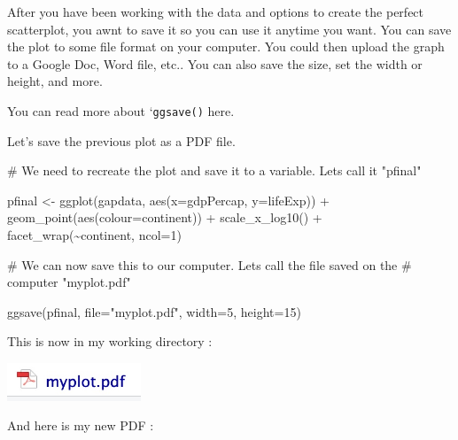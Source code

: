 \documentclass[
  letterpaper,
  DIV=11,
  numbers=noendperiod]{scrreprt}
\newenvironment{Shaded}{\begin{snugshade}}{\end{snugshade}}
\newcommand{\AttributeTok}[1]{\textcolor[rgb]{0.40,0.45,0.13}{#1}}
\newcommand{\CommentTok}[1]{\textcolor[rgb]{0.37,0.37,0.37}{#1}}
\newcommand{\DecValTok}[1]{\textcolor[rgb]{0.68,0.00,0.00}{#1}}
\newcommand{\FunctionTok}[1]{\textcolor[rgb]{0.28,0.35,0.67}{#1}}
\newcommand{\NormalTok}[1]{\textcolor[rgb]{0.00,0.23,0.31}{#1}}
\newcommand{\OtherTok}[1]{\textcolor[rgb]{0.00,0.23,0.31}{#1}}
\newcommand{\SpecialCharTok}[1]{\textcolor[rgb]{0.37,0.37,0.37}{#1}}
\newcommand{\StringTok}[1]{\textcolor[rgb]{0.13,0.47,0.30}{#1}}
\begin{document}
After you have been working with the data and options to create the
perfect scatterplot, you awnt to save it so you can use it anytime you
want. You can save the plot to some file format on your computer. You
could then upload the graph to a Google Doc, Word file, etc.. You can
also save the size, set the width or height, and more.

You can read more about `\texttt{ggsave()} here.

Let's save the previous plot as a PDF file.

\begin{Shaded}
\begin{Highlighting}[]
\CommentTok{\# We need to recreate the plot and save it to a variable. Let\textquotesingle{}s call it "pfinal"}

\NormalTok{pfinal }\OtherTok{\textless{}{-}} \FunctionTok{ggplot}\NormalTok{(gapdata, }\FunctionTok{aes}\NormalTok{(}\AttributeTok{x=}\NormalTok{gdpPercap, }\AttributeTok{y=}\NormalTok{lifeExp)) }\SpecialCharTok{+}
          \FunctionTok{geom\_point}\NormalTok{(}\FunctionTok{aes}\NormalTok{(}\AttributeTok{colour=}\NormalTok{continent)) }\SpecialCharTok{+}
          \FunctionTok{scale\_x\_log10}\NormalTok{() }\SpecialCharTok{+}
          \FunctionTok{facet\_wrap}\NormalTok{(}\SpecialCharTok{\textasciitilde{}}\NormalTok{continent, }\AttributeTok{ncol=}\DecValTok{1}\NormalTok{) }

\CommentTok{\# We can now save this to our computer. Let\textquotesingle{}s call the file saved on the }
\CommentTok{\# computer "myplot.pdf"}

\FunctionTok{ggsave}\NormalTok{(pfinal, }\AttributeTok{file=}\StringTok{"myplot.pdf"}\NormalTok{, }\AttributeTok{width=}\DecValTok{5}\NormalTok{, }\AttributeTok{height=}\DecValTok{15}\NormalTok{)}
\end{Highlighting}
\end{Shaded}

This is now in my working directory :

\includegraphics[width=0.3\textwidth,height=\textheight]{./images/AST_4.jpg}

And here is my new PDF :
\end{document}
